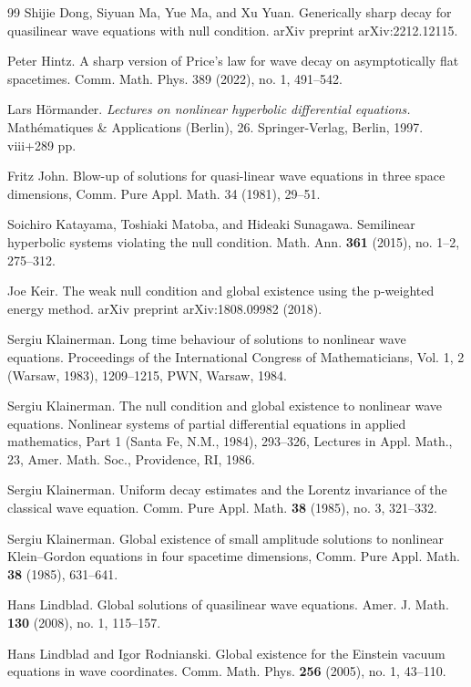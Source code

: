 \documentclass[a4paper,reqno]{amsart}
\theoremstyle{definition}
\numberwithin{equation}{section}
\begin{document}
\begin{thebibliography}{99}
 Shijie Dong, Siyuan Ma, Yue Ma, and Xu Yuan.
Generically sharp decay for quasilinear wave equations with null condition. arXiv preprint arXiv:2212.12115. 


 Peter Hintz.
A sharp version of Price's law for wave decay on asymptotically flat spacetimes.
Comm. Math. Phys. 389 (2022), no. 1, 491--542.

 Lars H\"ormander.
	 \emph{Lectures on nonlinear hyperbolic differential equations.} 
	 Mathématiques \& Applications (Berlin), 26. Springer-Verlag, Berlin, 1997. viii+289 pp.


 { Fritz John.}
Blow-up of solutions for quasi-linear wave equations in three space dimensions, 
Comm. Pure Appl. Math. 34 (1981), 29--51.

 Soichiro Katayama, Toshiaki Matoba, and Hideaki Sunagawa.
Semilinear hyperbolic systems violating the null condition. Math. Ann. \textbf{361} (2015), no. 1--2, 275--312.

 Joe Keir.
The weak null condition and global existence using the p-weighted energy method. arXiv preprint arXiv:1808.09982 (2018).

  Sergiu Klainerman.
Long time behaviour of solutions to nonlinear wave equations. 
Proceedings of the International Congress of Mathematicians, Vol. 1, 2 (Warsaw, 1983), 1209--1215, PWN, Warsaw, 1984.


  {Sergiu Klainerman.}
	The null condition and global existence to nonlinear wave equations. Nonlinear systems of partial differential equations in applied mathematics, 
	Part 1 (Santa Fe, N.M., 1984), 293--326,
	Lectures in Appl. Math., 23, Amer. Math. Soc., Providence, RI, 1986.


 Sergiu Klainerman.
	 Uniform decay estimates and the Lorentz invariance of the classical wave equation.
	 Comm. Pure Appl. Math. \textbf{38} (1985), no. 3, 321–332.
     
{Sergiu Klainerman.}
Global existence of small amplitude solutions to nonlinear Klein--Gordon equations in four spacetime dimensions,
Comm. Pure Appl. Math. \textbf{38} (1985), 631--641.


 Hans Lindblad. 
Global solutions of quasilinear wave equations. Amer. J. Math. \textbf{130} (2008), no. 1, 115--157.

 Hans Lindblad and Igor Rodnianski.
Global existence for the Einstein vacuum equations in wave coordinates. 
Comm. Math. Phys. \textbf{256} (2005), no. 1, 43--110.


\end{thebibliography}
\end{document}
